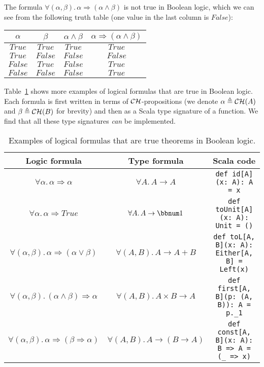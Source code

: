 The formula $\forall(\alpha,\beta).\,\alpha\Rightarrow(\alpha\wedge\beta)$
is not true in Boolean logic, which we can see from the following
truth table (one value in the last column is $False$):
\begin{center}
{\small{}}%
\begin{tabular}{|c|c|c|c|}
\hline 
{\small{}$\alpha$} & {\small{}$\beta$} & \textbf{\small{}$\alpha\wedge\beta$} & {\small{}$\alpha\Rightarrow(\alpha\wedge\beta)$}\tabularnewline
\hline 
\hline 
{\small{}$True$} & {\small{}$True$} & {\small{}$True$} & {\small{}$True$}\tabularnewline
\hline 
{\small{}$True$} & {\small{}$False$} & {\small{}$False$} & {\small{}$False$}\tabularnewline
\hline 
{\small{}$False$} & {\small{}$True$} & {\small{}$False$} & {\small{}$True$}\tabularnewline
\hline 
{\small{}$False$} & {\small{}$False$} & {\small{}$False$} & {\small{}$True$}\tabularnewline
\hline 
\end{tabular}{\small\par}
\par\end{center}

Table~\ref{tab:Logical-formulas-Boolean-theorems} shows more examples
of logical formulas that are true in Boolean logic. Each formula is
first written in terms of ${\cal CH}$-propositions (we denote $\alpha\triangleq{\cal CH}(A)$
and $\beta\triangleq{\cal CH}(B)$ for brevity) and then as a Scala
type signature of a function. We find that all these type signatures
\emph{can} be implemented.

\begin{table}
\begin{centering}
\begin{tabular}{|c|c|c|}
\hline 
\textbf{\small{}Logic formula} & \textbf{\small{}Type formula} & \textbf{\small{}Scala code}\tabularnewline
\hline 
\hline 
{\footnotesize{}$\forall\alpha.\,\alpha\Rightarrow\alpha$} & {\footnotesize{}$\forall A.\,A\rightarrow A$} & \lstinline!def id[A](x: A): A = x!\tabularnewline
\hline 
{\footnotesize{}$\forall\alpha.\,\alpha\Rightarrow True$} & {\footnotesize{}$\forall A.\,A\rightarrow\bbnum 1$} & \lstinline!def toUnit[A](x: A): Unit = ()!\tabularnewline
\hline 
{\footnotesize{}$\forall(\alpha,\beta).\,\alpha\Rightarrow(\alpha\vee\beta)$} & {\footnotesize{}$\forall(A,B).\,A\rightarrow A+B$} & \lstinline!def toL[A, B](x: A): Either[A, B] = Left(x)!\tabularnewline
\hline 
{\footnotesize{}$\forall(\alpha,\beta).\,(\alpha\wedge\beta)\Rightarrow\alpha$} & {\footnotesize{}$\forall(A,B).\,A\times B\rightarrow A$} & \lstinline!def first[A, B](p: (A, B)): A = p._1!\tabularnewline
\hline 
{\footnotesize{}$\forall(\alpha,\beta).\,\alpha\Rightarrow(\beta\Rightarrow\alpha)$} & {\footnotesize{}$\forall(A,B).\,A\rightarrow(B\rightarrow A)$} & \lstinline!def const[A, B](x: A): B => A = (_ => x)!\tabularnewline
\hline 
\end{tabular}
\par\end{centering}
\caption{Examples of logical formulas that are true theorems in Boolean logic.\label{tab:Logical-formulas-Boolean-theorems}}
\end{table}

